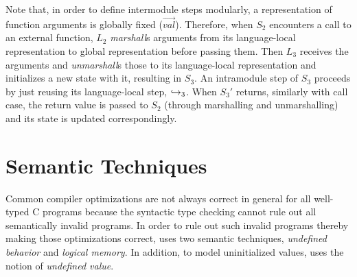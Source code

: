{

Note that, in order to define intermodule steps modularly, a representation of function arguments is globally fixed ($\overrightarrow{val}$).
Therefore, when $S_2$ encounters a call to an external function, $L_2$ \emph{marshall}s arguments from its language-local representation to global representation before passing them.
Then $L_3$ receives the arguments and \emph{unmarshall}s those to its language-local representation and initializes a new state with it, resulting in $S_3$.
An intramodule step of $S_3$ proceeds by just reusing its language-local step, $\stackrel{}{\hookrightarrow}_3$.
When $S_3'$ returns, similarly with call case, the return value is passed to $S_2$ (through marshalling and unmarshalling) and its state is updated correspondingly.





\section{Semantic Techniques}\label{sec:background:ub}

Common compiler optimizations are not always correct in general for
all well-typed C programs because the syntactic type checking cannot
rule out all semantically invalid programs. In order to rule out such
invalid programs thereby making those optimizations correct, \cc{}
uses two semantic techniques, \emph{undefined behavior} and
\emph{logical memory}. In addition, to model uninitialized values,
\cc{} uses the notion of \emph{undefined value}.

}
